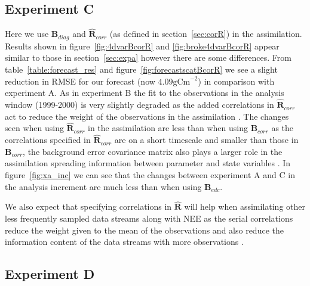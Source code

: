 \documentclass[11pt]{article}
\begin{document}

\subsection{Experiment C} \label{sec:expc}

Here we use $\textbf{B}_{diag}$ and $\hat{\textbf{R}}_{corr}$ (as defined in section~\ref{sec:corR}) in the assimilation. Results shown in figure~\ref{fig:4dvarBcorR} and \ref{fig:broke4dvarBcorR} appear similar to those in section~\ref{sec:expa} however there are some differences. From table~\ref{table:forecast_res} and figure~\ref{fig:forecastscatBcorR} we see a slight reduction in RMSE for our forecast (now $4.09 \text{gCm}^{-2}$) in comparison with experiment A. As in experiment B the fit to the observations in the analysis window (1999-2000) is very slightly degraded as the added correlations in $\hat{\textbf{R}}_{corr}$ act to reduce the weight of the observations in the assimilation \citep{jarvinen1999variational}. The changes seen when using $\hat{\textbf{R}}_{corr}$ in the assimilation are less than when using $\textbf{B}_{corr}$ as the correlations specified in $\hat{\textbf{R}}_{corr}$ are on a short timescale and smaller than those in $\textbf{B}_{corr}$, the background error covariance matrix also plays a larger role in the assimilation spreading information between parameter and state variables \citep{bannister2008review}. In figure~\ref{fig:xa_inc} we can see that the changes between experiment A and C in the analysis increment are much less than when using $\textbf{B}_{edc}$.  

We also expect that specifying correlations in $\hat{\textbf{R}}$ will help when assimilating other less frequently sampled data streams along with NEE as the serial correlations reduce the weight given to the mean of the observations and also reduce the information content of the data streams with more observations \citep{jarvinen1999variational, Daley1992}.

\subsection{Experiment D}
\end{document}
